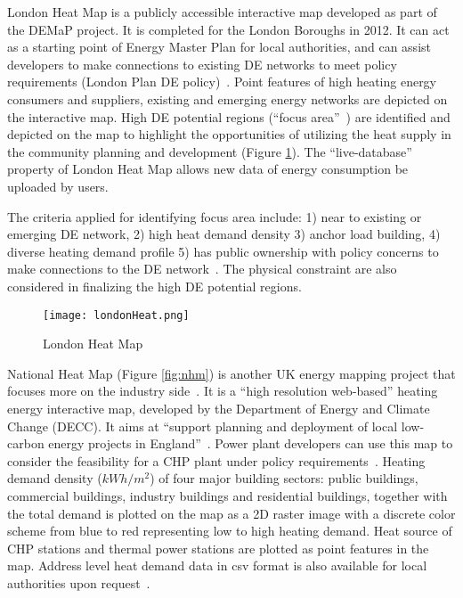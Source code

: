 \documentclass[hidelinks,12pt]{article}
\newcommand{\fref}[1]{Figure \ref{#1}}
\begin{document}
London Heat Map is a publicly accessible interactive map developed as
part of the DEMaP project. It is completed for the London Boroughs in
2012. It can act as a starting point of Energy Master Plan for local
authorities, and can assist developers to make connections to existing
DE networks to meet policy requirements (London Plan DE
policy)~\cite{decentralHeatMap2011, londonHeatMap}. Point features of
high heating energy consumers and suppliers, existing and emerging
energy networks are depicted on the interactive map. High DE potential
regions (``focus area''~\cite{decentralHeatMap2011}) are identified
and depicted on the map to highlight the opportunities of utilizing
the heat supply in the community planning and development
(\fref{fig:londonHeat}). The ``live-database'' property of London Heat
Map allows new data of energy consumption be uploaded by users.

The criteria applied for identifying focus area include: 1) near to
existing or emerging DE network, 2) high heat demand density 3) anchor
load building, 4) diverse heating demand profile 5) has public
ownership with policy concerns to make connections to the DE
network~\cite{decentralHeatMap2011}. The physical constraint are also
considered in finalizing the high DE potential regions.
\begin{figure}[h!]
  \centering
  \texttt{[image: londonHeat.png]}
  \caption{London Heat Map~\cite{londonHeatMapMap}}
  \label{fig:londonHeat}
\end{figure}

National Heat Map (\fref{fig:nhm}) is another UK energy mapping
project that focuses more on the industry
side~\cite{decentralHeatMap2011}. It is a ``high resolution
web-based'' heating energy interactive map, developed by the
Department of Energy and Climate Change (DECC). It aims at ``support
planning and deployment of local low-carbon energy projects in
England''~\cite{heatMap2015}. Power plant developers can use this map
to consider the feasibility for a CHP plant under policy
requirements~\cite{decentralHeatMap2011}. Heating demand density
($kWh/m^2$) of four major building sectors: public buildings,
commercial buildings, industry buildings and residential buildings,
together with the total demand is plotted on the map as a 2D raster
image with a discrete color scheme from blue to red representing low
to high heating demand. Heat source of CHP stations and thermal power
stations are plotted as point features in the map. Address level heat
demand data in csv format is also available for local authorities upon
request~\cite{heatMapLocal2012}.
\end{document}
